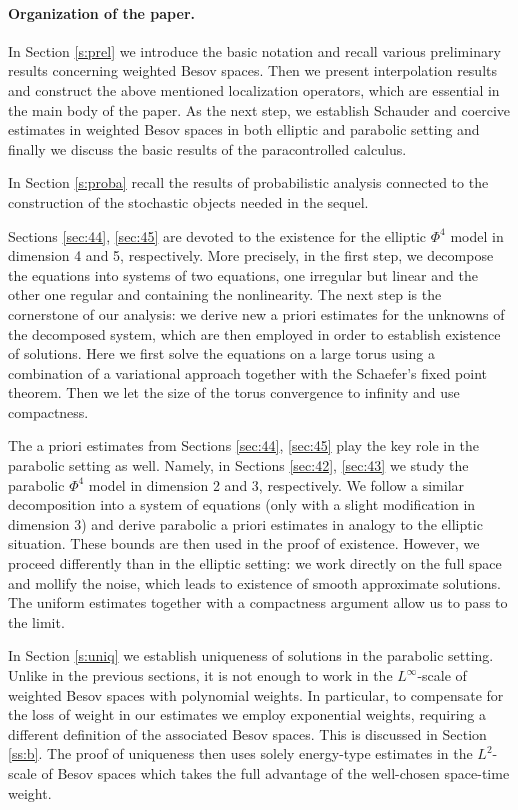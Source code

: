 \documentclass[a4paper,11pt]{article}
\numberwithin{equation}{section}
\newcommand{\8}{\infty}
\begin{document}
\paragraph{Organization of the paper.} In Section \ref{s:prel} we introduce the basic notation and recall  various preliminary results concerning weighted Besov spaces. Then we present interpolation results  and construct the above mentioned localization operators, which are essential in the main body of the paper. As the next step, we establish Schauder and coercive estimates in weighted Besov spaces in both elliptic and parabolic setting and finally we discuss the basic results of the paracontrolled calculus.

In Section \ref{s:proba} recall the results of probabilistic analysis connected to the construction of the  stochastic objects needed in the sequel.

Sections \ref{sec:44}, \ref{sec:45} are devoted to the existence for the elliptic $\Phi^{4}$ model in dimension 4 and 5, respectively. More precisely, in the first step, we decompose the equations into  systems of two equations, one irregular but linear and the other one regular and containing the nonlinearity. The next step is the cornerstone of our  analysis: we derive new a priori estimates for the unknowns of the decomposed system, which are then employed in order to establish existence of solutions. Here we first solve the equations on a large torus using a combination of a variational approach together with the Schaefer's fixed point theorem. Then we let the size of the torus convergence to infinity and use compactness.

The a priori estimates from Sections \ref{sec:44}, \ref{sec:45} play the key role in the parabolic setting as well. Namely, in Sections \ref{sec:42}, \ref{sec:43} we study the parabolic $\Phi^{4}$ model in dimension 2 and 3, respectively. We follow a similar decomposition into a system of equations (only with a slight modification in dimension 3) and derive parabolic a priori estimates in analogy to the elliptic situation. These bounds are then used in the proof of existence. However, we proceed differently than in the elliptic setting: we work directly on the full space and mollify the noise, which leads to existence of smooth approximate solutions. The uniform estimates together with a compactness argument allow us to pass to the limit.



In Section \ref{s:uniq} we establish uniqueness of solutions in the parabolic setting. Unlike in the previous sections, it is not enough to work in the $L^{\infty}$-scale of weighted Besov spaces with polynomial weights. In particular, to compensate for the loss of weight in our estimates we employ exponential weights, requiring a different definition of the associated Besov spaces. This is discussed in Section \ref{ss:b}. The  proof of uniqueness then uses solely energy-type estimates in the $L^{2}$-scale of Besov spaces which  takes the full advantage of the well-chosen space-time weight.
\end{document}
